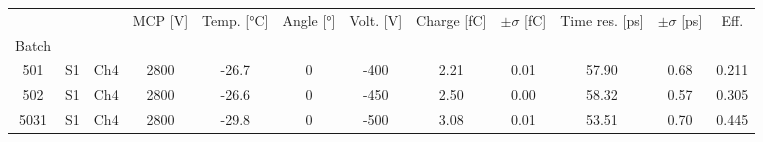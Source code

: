 \begin{tabular}{cccccccccccc}
\toprule
 &  &  & MCP [V] & Temp. [°C] & Angle [°] & Volt. [V] & Charge [fC] & \(\pm\sigma\) [fC] & Time res. [ps] & \(\pm\sigma\) [ps] & Eff. \\
Batch &  &  &  &  &  &  &  &  &  &  &  \\
\midrule
501 & S1 & Ch4 & 2800 & -26.7 & 0 & -400 & 2.21 & 0.01 & 57.90 & 0.68 & 0.211 \\
502 & S1 & Ch4 & 2800 & -26.6 & 0 & -450 & 2.50 & 0.00 & 58.32 & 0.57 & 0.305 \\
5031 & S1 & Ch4 & 2800 & -29.8 & 0 & -500 & 3.08 & 0.01 & 53.51 & 0.70 & 0.445 \\
\bottomrule
\end{tabular}
